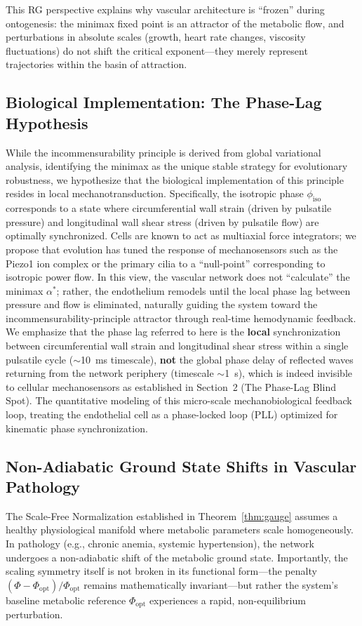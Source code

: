 This RG perspective explains why vascular architecture is ``frozen'' during
ontogenesis: the minimax fixed point is an attractor of the metabolic flow, and
perturbations in absolute scales (growth, heart rate changes, viscosity
fluctuations) do not shift the critical exponent—they merely represent
trajectories within the basin of attraction.

\subsection{Biological Implementation: The Phase-Lag Hypothesis}

While the incommensurability principle is derived from global variational
analysis, identifying the minimax as the unique stable strategy for evolutionary
robustness, we hypothesize that the biological implementation of this principle
resides in local mechanotransduction. Specifically, the isotropic phase
$\phi_{\mathrm{iso}}$ corresponds to a state where circumferential wall strain
(driven by pulsatile pressure) and longitudinal wall shear stress (driven by
pulsatile flow) are optimally synchronized. Cells are known to act as multiaxial
force integrators; we propose that evolution has tuned the response of
mechanosensors such as the Piezo1 ion complex or the primary cilia to a
``null-point'' corresponding to isotropic power flow. In this view, the vascular
network does not ``calculate'' the minimax $\alpha^*$; rather, the endothelium
remodels until the local phase lag between pressure and flow is eliminated,
naturally guiding the system toward the incommensurability-principle attractor
through real-time hemodynamic feedback. We emphasize that the phase lag referred
to here is the \textbf{local} synchronization between circumferential wall
strain and longitudinal shear stress within a single pulsatile cycle
($\sim$10~ms timescale), \textbf{not} the global phase delay of reflected waves
returning from the network periphery (timescale $\sim$1~s), which is indeed
invisible to cellular mechanosensors as established in Section~2 (The Phase-Lag
Blind Spot). The quantitative modeling of this micro-scale mechanobiological
feedback loop, treating the endothelial cell as a phase-locked loop (PLL)
optimized for kinematic phase synchronization.

\subsection{Non-Adiabatic Ground State Shifts in Vascular Pathology}
The Scale-Free Normalization established in Theorem~\ref{thm:gauge} assumes a
healthy physiological manifold where metabolic parameters scale homogeneously.
In pathology (e.g., chronic anemia, systemic hypertension), the network
undergoes a non-adiabatic shift of the metabolic ground state. Importantly, the
scaling symmetry itself is not broken in its functional form—the penalty $(\Phi
- \Phi_{\mathrm{opt}})/\Phi_{\mathrm{opt}}$ remains mathematically invariant—but
rather the system's baseline metabolic reference $\Phi_{\mathrm{opt}}$
experiences a rapid, non-equilibrium perturbation.

